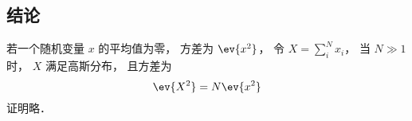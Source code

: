 
\subsection{结论}
若一个随机变量 $x$ 的平均值为零， 方差为 $\ev{x^2}$， 令 $X = \sum_i^N x_i$， 当 $N \gg 1$ 时， $X$ 满足高斯分布， 且方差为
\begin{equation}
\ev{X^2} = N\ev{x^2}
\end{equation}
证明略．